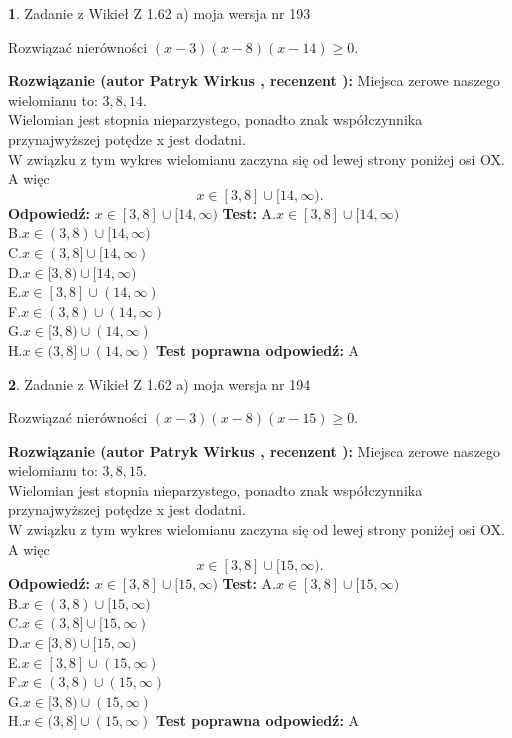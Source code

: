 \documentclass[12pt, a4paper]{article}
\theoremstyle{definition} %
\newtheorem{zad}{}
\newcommand{\zadStart}[1]{\begin{zad}#1\newline}
\newcommand{\zadStop}{\end{zad}}
\newcommand{\rozwStart}[2]{\noindent \textbf{Rozwiązanie (autor #1 , recenzent #2): }\newline}
\newcommand{\rozwStop}{\newline}
\newcommand{\odpStart}{\noindent \textbf{Odpowiedź:}\newline}
\newcommand{\odpStop}{\newline}
\newcommand{\testStart}{\noindent \textbf{Test:}\newline}
\newcommand{\testStop}{\newline}
\newcommand{\kluczStart}{\noindent \textbf{Test poprawna odpowiedź:}\newline}
\newcommand{\kluczStop}{\newline}
\begin{document}
\zadStart{Zadanie z Wikieł Z 1.62 a) moja wersja nr 193}

Rozwiązać nierówności $(x-3)(x-8)(x-14)\ge0$.
\zadStop
\rozwStart{Patryk Wirkus}{}
Miejsca zerowe naszego wielomianu to: $3, 8, 14$.\\
Wielomian jest stopnia nieparzystego, ponadto znak współczynnika przy\linebreak najwyższej potędze x jest dodatni.\\ W związku z tym wykres wielomianu zaczyna się od lewej strony poniżej osi OX. A więc $$x \in [3,8] \cup [14,\infty).$$
\rozwStop
\odpStart
$x \in [3,8] \cup [14,\infty)$
\odpStop
\testStart
A.$x \in [3,8] \cup [14,\infty)$\\
B.$x \in (3,8) \cup [14,\infty)$\\
C.$x \in (3,8] \cup [14,\infty)$\\
D.$x \in [3,8) \cup [14,\infty)$\\
E.$x \in [3,8] \cup (14,\infty)$\\
F.$x \in (3,8) \cup (14,\infty)$\\
G.$x \in [3,8) \cup (14,\infty)$\\
H.$x \in (3,8] \cup (14,\infty)$
\testStop
\kluczStart
A
\kluczStop



\zadStart{Zadanie z Wikieł Z 1.62 a) moja wersja nr 194}

Rozwiązać nierówności $(x-3)(x-8)(x-15)\ge0$.
\zadStop
\rozwStart{Patryk Wirkus}{}
Miejsca zerowe naszego wielomianu to: $3, 8, 15$.\\
Wielomian jest stopnia nieparzystego, ponadto znak współczynnika przy\linebreak najwyższej potędze x jest dodatni.\\ W związku z tym wykres wielomianu zaczyna się od lewej strony poniżej osi OX. A więc $$x \in [3,8] \cup [15,\infty).$$
\rozwStop
\odpStart
$x \in [3,8] \cup [15,\infty)$
\odpStop
\testStart
A.$x \in [3,8] \cup [15,\infty)$\\
B.$x \in (3,8) \cup [15,\infty)$\\
C.$x \in (3,8] \cup [15,\infty)$\\
D.$x \in [3,8) \cup [15,\infty)$\\
E.$x \in [3,8] \cup (15,\infty)$\\
F.$x \in (3,8) \cup (15,\infty)$\\
G.$x \in [3,8) \cup (15,\infty)$\\
H.$x \in (3,8] \cup (15,\infty)$
\testStop
\kluczStart
A
\kluczStop
\end{document}
